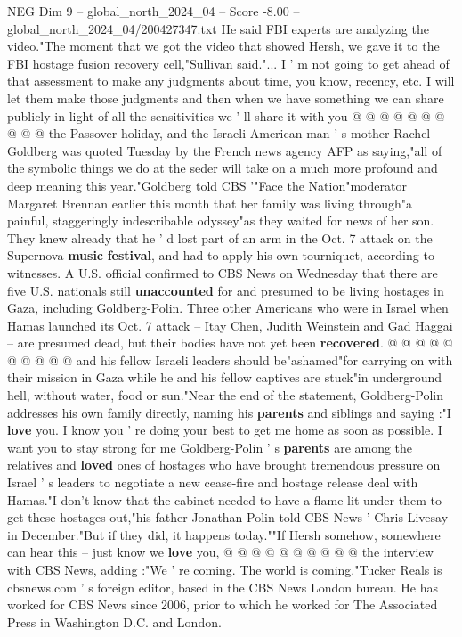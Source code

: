 \begin{textsample}{NEG Dim 9 – global\_north\_2024\_04 – Score -8.00 – global\_north\_2024\_04/200427347.txt}
He said FBI experts are analyzing the video."The moment that we got the video that showed Hersh, we gave it to the FBI hostage fusion recovery cell,"Sullivan said."...
I ' m not going to get ahead of that assessment to make any judgments about time, you know, recency, etc.
I will let them make those judgments and then when we have something we can share publicly in light of all the sensitivities we ' ll share it with you @ @ @ @ @ @ @ @ @ @ the Passover holiday, and the Israeli-American man ' s mother Rachel Goldberg was quoted Tuesday by the French news agency AFP as saying,"all of the symbolic things we do at the seder will take on a much more profound and deep meaning this year."Goldberg told CBS '"Face the Nation"moderator Margaret Brennan earlier this month that her family was living through"a painful, staggeringly indescribable odyssey"as they waited for news of her son.
They knew already that he ' d lost part of an arm in the Oct. 7 attack on the Supernova \textbf{music} \textbf{festival}, and had to apply his own tourniquet, according to witnesses.
A U.S. official confirmed to CBS News on Wednesday that there are five U.S. nationals still \textbf{unaccounted} for and presumed to be living hostages in Gaza, including Goldberg-Polin.
Three other Americans who were in Israel when Hamas launched its Oct. 7 attack -- Itay Chen, Judith Weinstein and Gad Haggai -- are presumed dead, but their bodies have not yet been \textbf{recovered}. @ @ @ @ @ @ @ @ @ @ and his fellow Israeli leaders should be"ashamed"for carrying on with their mission in Gaza while he and his fellow captives are stuck"in underground hell, without water, food or sun."Near the end of the statement, Goldberg-Polin addresses his own family directly, naming his \textbf{parents} and siblings and saying :"I \textbf{love} you.
I know you ' re doing your best to get me home as soon as possible.
I want you to stay strong for me Goldberg-Polin ' s \textbf{parents} are among the relatives and \textbf{loved} ones of hostages who have brought tremendous pressure on Israel ' s leaders to negotiate a new cease-fire and hostage release deal with Hamas."I don't know that the cabinet needed to have a flame lit under them to get these hostages out,"his father Jonathan Polin told CBS News ' Chris Livesay in December."But if they did, it happens today.""If Hersh somehow, somewhere can hear this -- just know we \textbf{love} you, @ @ @ @ @ @ @ @ @ @ the interview with CBS News, adding :"We ' re coming.
The world is coming."Tucker Reals is cbsnews.com ' s foreign editor, based in the CBS News London bureau.
He has worked for CBS News since 2006, prior to which he worked for The Associated Press in Washington D.C. and London.

\end{textsample}
